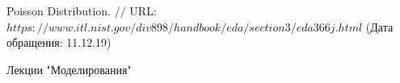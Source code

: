 \makeatletter \renewcommand{} \makeatother
\renewcommand\refname{Список использованных источников}
\begin{thebibliography}{00}
	
	Poisson Distribution. $//$ URL: $https://www.itl.nist.gov/div898/handbook/eda/section3/eda366j.html$  (Дата обращения: 11.12.19)
	
	Лекции "Моделирования"
\end{thebibliography}
